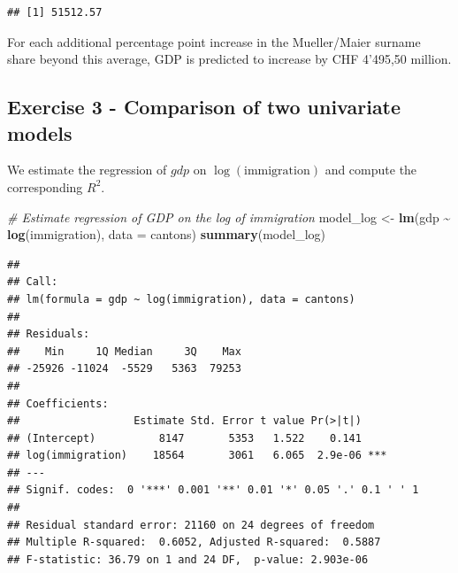 \documentclass[
]{article}
\newenvironment{Shaded}{\begin{snugshade}}{\end{snugshade}}
\newcommand{\AttributeTok}[1]{\textcolor[rgb]{0.13,0.29,0.53}{#1}}
\newcommand{\CommentTok}[1]{\textcolor[rgb]{0.56,0.35,0.01}{\textit{#1}}}
\newcommand{\FunctionTok}[1]{\textcolor[rgb]{0.13,0.29,0.53}{\textbf{#1}}}
\newcommand{\NormalTok}[1]{#1}
\newcommand{\OtherTok}[1]{\textcolor[rgb]{0.56,0.35,0.01}{#1}}
\newcommand{\SpecialCharTok}[1]{\textcolor[rgb]{0.81,0.36,0.00}{\textbf{#1}}}
\begin{document}
\begin{Shaded}
\end{Shaded}

\begin{verbatim}
## [1] 51512.57
\end{verbatim}

For each additional percentage point increase in the Mueller/Maier
surname share beyond this average, GDP is predicted to increase by CHF
4'495,50 million.

\subsection{Exercise 3 - Comparison of two univariate
models}\label{exercise-3---comparison-of-two-univariate-models}

We estimate the regression of \(gdp\) on \(\log(\text{immigration})\)
and compute the corresponding \(R^2\).

\begin{Shaded}
\begin{Highlighting}[]
\CommentTok{\# Estimate regression of GDP on the log of immigration}
\NormalTok{model\_log }\OtherTok{\textless{}{-}} \FunctionTok{lm}\NormalTok{(gdp }\SpecialCharTok{\textasciitilde{}} \FunctionTok{log}\NormalTok{(immigration), }\AttributeTok{data =}\NormalTok{ cantons)}
\FunctionTok{summary}\NormalTok{(model\_log)}
\end{Highlighting}
\end{Shaded}

\begin{verbatim}
## 
## Call:
## lm(formula = gdp ~ log(immigration), data = cantons)
## 
## Residuals:
##    Min     1Q Median     3Q    Max 
## -25926 -11024  -5529   5363  79253 
## 
## Coefficients:
##                  Estimate Std. Error t value Pr(>|t|)    
## (Intercept)          8147       5353   1.522    0.141    
## log(immigration)    18564       3061   6.065  2.9e-06 ***
## ---
## Signif. codes:  0 '***' 0.001 '**' 0.01 '*' 0.05 '.' 0.1 ' ' 1
## 
## Residual standard error: 21160 on 24 degrees of freedom
## Multiple R-squared:  0.6052, Adjusted R-squared:  0.5887 
## F-statistic: 36.79 on 1 and 24 DF,  p-value: 2.903e-06
\end{verbatim}
\end{document}
